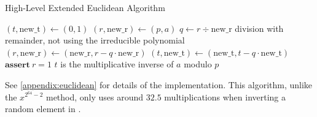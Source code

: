 \begin{algorithm}
    \caption{High-Level Extended Euclidean Algorithm}
    \begin{algorithmic}
        \State $(t, \text{new\_t}) \gets (0, 1)$
        \State $(r, \text{new\_r}) \gets (p, a)$
            \State $q \gets r \div \text{new\_r}$ \Comment division with remainder, not using the irreducible polynomial
            \State $(r, \text{new\_r}) \gets (\text{new\_r}, r - q \cdot \text{new\_r})$
            \State $(t, \text{new\_t}) \gets (\text{new\_t}, t - q \cdot \text{new\_t})$
        \EndWhile
        \State $\textbf{assert}\ r = 1$
        \Comment $t$ is the multiplicative inverse of $a$ modulo $p$
    \end{algorithmic}
\end{algorithm}

See \ref{appendix:euclidean} for details of the implementation.
This algorithm, unlike the $x^{2^{64} - 2}$ method, only uses around $32.5$ multiplications when inverting a random element in .
